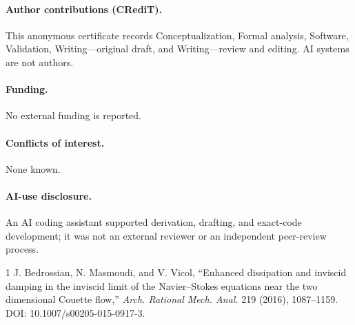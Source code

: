 \documentclass[9pt]{extarticle}
\begin{document}
\paragraph{Author contributions (CRediT).} This anonymous certificate records
Conceptualization, Formal analysis, Software, Validation, Writing---original
draft, and Writing---review and editing. AI systems are not authors.
\paragraph{Funding.} No external funding is reported.
\paragraph{Conflicts of interest.} None known.
\paragraph{AI-use disclosure.} An AI coding assistant supported derivation,
drafting, and exact-code development; it was not an external reviewer or an
independent peer-review process.

\begin{thebibliography}{1}
 J. Bedrossian, N. Masmoudi, and V. Vicol,
``Enhanced dissipation and inviscid damping in the inviscid limit of the
Navier--Stokes equations near the two dimensional Couette flow,''
\emph{Arch. Rational Mech. Anal.} 219 (2016), 1087--1159.
DOI: 10.1007/s00205-015-0917-3.
\end{thebibliography}
\end{document}
